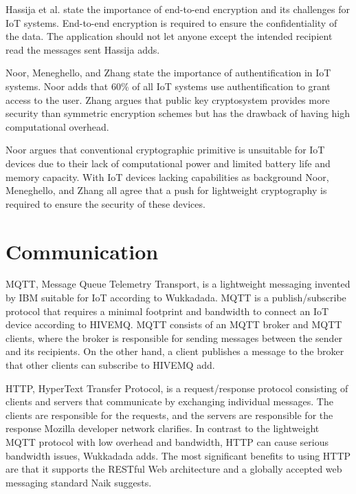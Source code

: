 Hassija et al. state the importance of end-to-end encryption and its challenges for IoT systems.
End-to-end encryption is required to ensure the confidentiality of the data. The application should not let anyone except the intended recipient read the messages sent Hassija adds.\cite{Hassija2019}

Noor, Meneghello, and Zhang state the importance of authentification in IoT systems.\cite{Noor2019,Meneghello2019,Zhang2014} 
Noor adds that 60\% of all IoT systems use authentification to grant access to the user.\cite{Noor2019}  
Zhang argues that public key cryptosystem provides more security than symmetric encryption schemes but has the drawback of having high computational overhead.\cite{Zhang2014} 

Noor argues that conventional cryptographic primitive is unsuitable for IoT devices due to their lack of computational power and limited battery life and memory capacity.\cite{Noor2019}
With IoT devices lacking capabilities as background Noor, Meneghello, and Zhang all agree that a push for lightweight cryptography is required to ensure the security of these devices.\cite {Noor2019,Meneghello2019,Zhang2014} 

\section{Communication} 
MQTT, Message Queue Telemetry Transport, is a lightweight messaging invented by IBM suitable for IoT according to Wukkadada.\cite{Wukkadada2018} 
MQTT is a publish/subscribe protocol that requires a minimal footprint and bandwidth to connect an IoT device according to HIVEMQ.\cite{MQTT2021}
MQTT consists of an MQTT broker and MQTT clients, where the broker is responsible for sending messages between the sender and its recipients.\cite{Wukkadada2018}
On the other hand, a client publishes a message to the broker that other clients can subscribe to HIVEMQ add.\cite{MQTT2021}

HTTP, HyperText Transfer Protocol, is a request/response protocol consisting of clients and servers that communicate by exchanging individual messages. 
The clients are responsible for the requests, and the servers are responsible for the response Mozilla developer network clarifies. \cite{HTTP2021} 
In contrast to the lightweight MQTT protocol with low overhead and bandwidth, HTTP can cause serious bandwidth issues, Wukkadada adds. \cite{Wukkadada2018}
The most significant benefits to using HTTP are that it supports the RESTful Web architecture and a globally accepted web messaging standard Naik suggests. \cite{Naik2017} 


